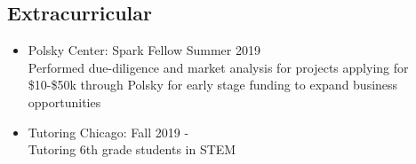 \documentclass[a4paper, 11pt]{article}
\begin{document}
\subsection*{Extracurricular}
\begin{itemize}
	\item  Polsky Center: Spark Fellow \hfill Summer 2019 \\
		Performed due-diligence and market analysis for projects applying for \$10-\$50k through Polsky for early stage funding to expand business opportunities  
	\item  Tutoring Chicago:  \hfill Fall 2019 -  \\
		Tutoring 6th grade students in STEM 	
\end{itemize}

\newpage



\end{document}
